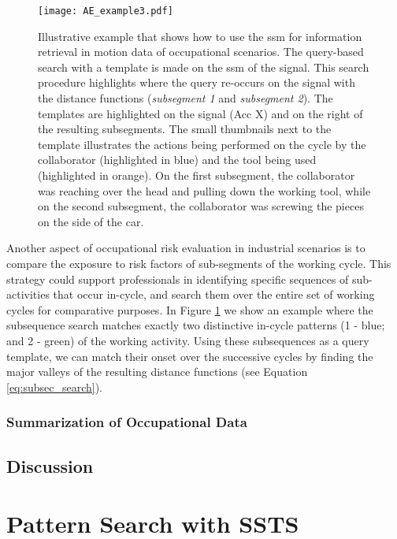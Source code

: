\begin{figure}
  \centering
      \texttt{[image: AE\_example3.pdf]}
  \caption{Illustrative example that shows how to use the \gls{ssm} for information retrieval in motion data of occupational scenarios. The query-based search with a template is made on the \gls{ssm} of the signal. This search procedure highlights where the query re-occurs on the signal with the distance functions (\textit{subsegment 1} and \textit{subsegment 2}). The templates are highlighted on the signal (Acc X) and on the right of the resulting subsegments. The small thumbnails next to the template illustrates the actions being performed on the cycle by the collaborator (highlighted in blue) and the tool being used (highlighted in orange). On the first subsegment, the collaborator was reaching over the head and pulling down the working tool, while on the second subsegment, the collaborator was screwing the pieces on the side of the car.}
  \label{fig:ae_example3}
\end{figure}

Another aspect of occupational risk evaluation in industrial scenarios is to compare the exposure to risk factors of sub-segments of the working cycle. This strategy could support professionals in identifying specific sequences of sub-activities that occur in-cycle, and search them over the entire set of working cycles for comparative purposes. In Figure \ref{fig:ae_example3} we show an example where the subsequence search matches exactly two distinctive in-cycle patterns (1 - blue; and 2 - green) of the working activity. Using these subsequences as a query template, we can match their onset over the successive cycles by finding the major valleys of the resulting distance functions (see Equation \ref{eq:subsec_search}).

\subsubsection{Summarization of Occupational Data}


\subsection{Discussion}
\label{results:discussion_info_retrieval}


\section{Pattern Search with SSTS}

